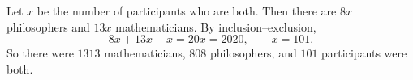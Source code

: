 Let $x$ be the number of participants who are both. Then there are $8x$ philosophers and $13x$ mathematicians. By inclusion--exclusion,
\[
8x+13x-x=20x=2020,\qquad x=101 .
\]
So there were $\boxed{1313}$ mathematicians, $\boxed{808}$ philosophers, and $\boxed{101}$ participants were both.
